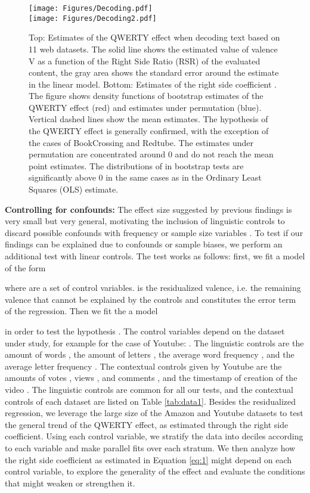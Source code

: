 \documentclass[letterpaper]{sig-alternate-2013}
\begin{document}
\begin{figure*}[ht] \centering
\texttt{[image: Figures/Decoding.pdf]}\\
\texttt{[image: Figures/Decoding2.pdf]}\\ \caption{Top:
Estimates of the QWERTY effect when decoding text based on 11 web datasets. The solid line shows
the estimated value of valence V as a function of the Right Side Ratio (RSR) of the evaluated content,
the gray area shows the standard error around the estimate in the linear
model.  Bottom: Estimates of the right side coefficient . The figure shows density functions of bootstrap estimates of the QWERTY effect
(red) and estimates under permutation (blue). Vertical dashed lines show the
mean estimates. The hypothesis of the QWERTY effect is generally confirmed,
with the exception of the cases of BookCrossing and Redtube.  The estimates
under permutation are concentrated around 0 and do not reach the mean point
estimates. The distributions of  in bootstrap tests are significantly
above 0 in the same cases as in the Ordinary Least Squares (OLS) estimate. \label{fig:Decoding}}
\end{figure*}


\textbf{Controlling for confounds:} The effect size suggested by previous
findings is very small but very general, motivating the inclusion of
linguistic controls to discard possible confounds with  frequency or sample
size variables \cite{Casasanto2014}. To test if our findings can be explained
due to confounds or sample biases, we perform an additional test with linear
controls. The test works as follows: first, we fit a model of the form

where  are a set of control variables.  is the residualized valence,
i.e. the remaining valence that cannot be explained by the controls and
constitutes the error term of the regression. Then we fit the a model

in order to test the hypothesis . The control variables depend on the
dataset under study, for example for the case of Youtube: . The linguistic controls are the amount of words
, the amount of letters , the average word frequency , and the
average letter frequency . The contextual controls given by Youtube are
the amounts of votes , views , and comments , and the timestamp
of creation of the video . The linguistic controls are common for all our
tests, and the contextual controls of each dataset are listed on Table
\ref{tab:data1}. Besides the  residualized regression, we leverage the large
size of the Amazon and Youtube datasets to test the general trend of the
QWERTY effect, as estimated through the  right side coefficient. Using each
control variable, we stratify the data into deciles according to each variable
and make parallel fits over each stratum. We then analyze  how the right side
coefficient as estimated in Equation \ref{eq:1} might depend on each control
variable, to explore the generality of the effect and evaluate the conditions
that might weaken or strengthen it.
\end{document}
